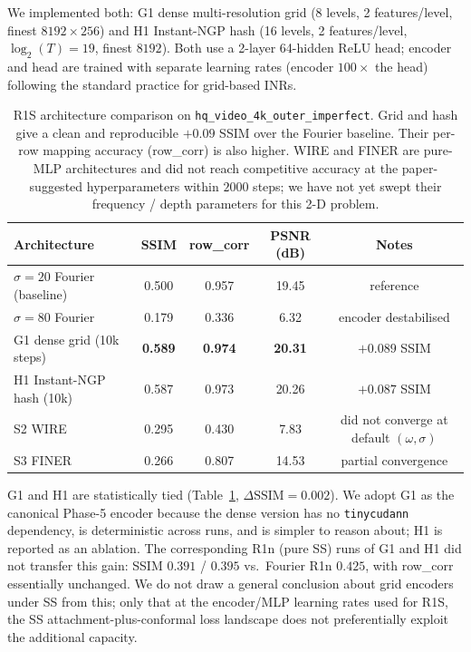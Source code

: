 \documentclass[11pt,a4paper]{article}
\begin{document}
We implemented both: G1 dense multi-resolution grid (8 levels, 2 features/level, finest $8192\times256$) and H1 Instant-NGP hash (16 levels, 2 features/level, $\log_2(T) = 19$, finest $8192$). Both use a 2-layer 64-hidden ReLU head; encoder and head are trained with separate learning rates (encoder $100\times$ the head) following the standard practice for grid-based INRs.

\begin{table}[H]
\centering
\begin{tabular}{lcccc}
\toprule
Architecture & SSIM & row\_corr & PSNR (dB) & Notes \\
\midrule
$\sigma=20$ Fourier (baseline) & 0.500 & 0.957 & 19.45 & reference \\
$\sigma=80$ Fourier            & 0.179 & 0.336 & 6.32  & encoder destabilised \\
G1 dense grid (10k steps)      & \textbf{0.589} & \textbf{0.974} & \textbf{20.31} & $+0.089$ SSIM \\
H1 Instant-NGP hash (10k)      & 0.587 & 0.973 & 20.26 & $+0.087$ SSIM \\
S2 WIRE \cite{saragadam2023wire} & 0.295 & 0.430 & 7.83  & did not converge at default $(\omega,\sigma)$ \\
S3 FINER \cite{liu2024finer}     & 0.266 & 0.807 & 14.53 & partial convergence \\
\bottomrule
\end{tabular}
\caption{R1S architecture comparison on \texttt{hq\_video\_4k\_outer\_imperfect}. Grid and hash give a clean and reproducible $+0.09$ SSIM over the Fourier baseline. Their per-row mapping accuracy (row\_corr) is also higher. WIRE and FINER are pure-MLP architectures and did not reach competitive accuracy at the paper-suggested hyperparameters within $2000$ steps; we have not yet swept their frequency / depth parameters for this 2-D problem.}
\label{tab:phase5_arch}
\end{table}

G1 and H1 are statistically tied (Table~\ref{tab:phase5_arch}, $\Delta\mathrm{SSIM}=0.002$). We adopt G1 as the canonical Phase-5 encoder because the dense version has no \texttt{tinycudann} dependency, is deterministic across runs, and is simpler to reason about; H1 is reported as an ablation. The corresponding R1n (pure SS) runs of G1 and H1 did not transfer this gain: SSIM $0.391$ / $0.395$ vs.\ Fourier R1n $0.425$, with row\_corr essentially unchanged. We do not draw a general conclusion about grid encoders under SS from this; only that at the encoder/MLP learning rates used for R1S, the SS attachment-plus-conformal loss landscape does not preferentially exploit the additional capacity.
\end{document}
